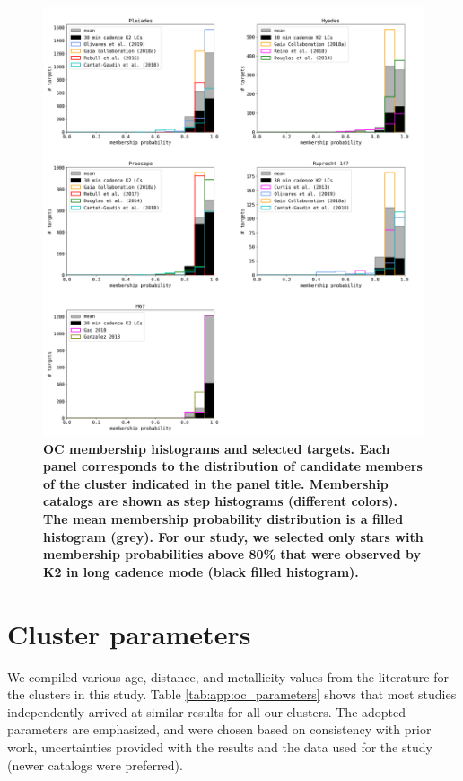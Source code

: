 \documentclass{aa}
\begin{document}
\begin{appendix}

   \begin{figure}[ht!]
            \includegraphics[width=\hsize]{pics/appendix/membership_histograms.png}
         \caption{\textbf{OC membership histograms and selected targets. Each panel corresponds to the distribution of candidate members of the cluster indicated in the panel title. Membership catalogs are shown as step histograms (different colors). The mean membership probability distribution is a filled histogram (grey). For our study, we selected only stars with membership probabilities above 80\% that were observed by K2 in long cadence mode (black filled histogram).}}
          \label{fig:app:memberships}
   \end{figure}

\section{Cluster parameters}
\label{app:cluster_params}
We compiled various age, distance, and metallicity values from the literature for the clusters in this study. Table \ref{tab:app:oc_parameters} shows that most studies independently arrived at similar results for all our clusters. The adopted parameters are emphasized, and were chosen based on consistency with prior work, uncertainties provided with the results and the data used for the study (newer catalogs were preferred). 



\end{appendix}
\end{document}
